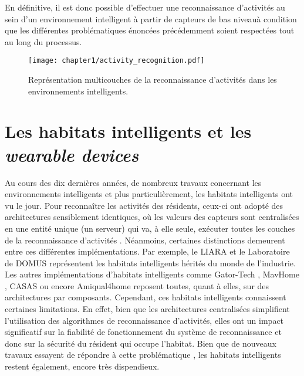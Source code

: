 {{En définitive, il est donc possible d'effectuer une reconnaissance d'activités au sein d'un environnement intelligent à partir de capteurs de bas niveau\textemdash à condition que les différentes problématiques énoncées précédemment soient respectées tout au long du processus.

\begin{figure}[H]
	\centering
	\texttt{[image: chapter1/activity\_recognition.pdf]}
	\caption{Représentation multicouches de la reconnaissance d'activités dans les environnements intelligents.}
	\label{fig:activity_recognition}
\end{figure}

\section{Les habitats intelligents et les \textit{wearable devices}}

Au cours des dix dernières années, de nombreux travaux concernant les environnements intelligents et plus particulièrement, les habitats intelligents ont vu le jour. Pour reconnaître les activités des résidents, ceux-ci ont adopté des architectures sensiblement identiques, où les valeurs des capteurs sont centralisées en une entité unique (un serveur) qui va, à elle seule, exécuter toutes les couches de la reconnaissance d'activités \citep{Bouchard2014, Hu2016}. Néanmoins, certaines distinctions demeurent entre ces différentes implémentations. Par exemple, le \ac{LIARA} \citep{Bouchard2014} et le Laboratoire de \ac{DOMUS} \citep{Giroux2009} représentent les habitats intelligents hérités du monde de l'industrie. Les autres implémentations d'habitats intelligents comme Gator-Tech \citep{Helal2005}, MavHome \citep{DJCook2003}, CASAS \citep{Cook2013} ou encore Amiqual4home \citep{Lago2017} reposent toutes, quant à elles, sur des architectures par composants. Cependant, ces habitats intelligents connaissent certaines limitations. En effet, bien que les architectures centralisées simplifient l'utilisation des algorithmes de reconnaissance d'activités, elles ont un impact significatif sur la fiabilité de fonctionnement du système de reconnaissance et donc sur la sécurité du résident qui occupe l'habitat. Bien que de nouveaux travaux essayent de répondre à cette problématique \citep{Cook2013, Plantevin2018}, les habitats intelligents restent également, encore très dispendieux.

}}
